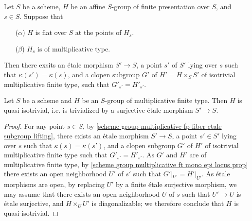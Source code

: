 \begin{theorem}\label{scheme group multiplicative fp fiber etale subgroup lifting}
Let $S$ be a scheme, $H$ be an affine $S$-group of finite presentation over $S$, and $s\in S$. Suppose that
\begin{enumerate}
    \item[($\alpha$)] $H$ is flat over $S$ at the points of $H_s$.
    \item[($\beta$)] $H_s$ is of multiplicative type. 
\end{enumerate}
Then there exsits an \'etale morphism $S'\to S$, a point $s'$ of $S'$ lying over $s$ such that $\kappa(s')=\kappa(s)$, and a clopen subgroup $G'$ of $H'=H\times_SS'$ of isotrivial multiplicative finite type, such that $G'_{s'}=H'_{s'}$.
\end{theorem}

\begin{corollary}\label{scheme group multiplicative ft is quasi-isotrivial}
Let $S$ be a scheme and $H$ be an $S$-group of multiplicative finite type. Then $H$ is quasi-isotrivial, i.e. is trivialized by a surjective \'etale morphism $S'\to S$.
\end{corollary}
\begin{proof}
For any point $s\in S$, by \cref{scheme group multiplicative fp fiber etale subgroup lifting}, there exists an \'etale morphism $S'\to S$, a point $s'\in S'$ lying over $s$ such that $\kappa(s)=\kappa(s')$, and a clopen subgroup $G'$ of $H'$ of isotrivial multiplicative finite type such that $G'_{s'}=H'_{s'}$. As $G'$ and $H'$ are of multiplicative finite type, by \cref{scheme group multiplicative ft mono epi locus prop} there exists an open neighborhood $U'$ of $s'$ such that $G'|_{U'}=H'|_{U'}$. As \'etale morphisms are open, by replacing $U'$ by a finite \'etale surjective morphism, we may assume that there exists an open neighborhood $U$ of $s$ such that $U'\to U$ is \'etale surjective, and $H\times_UU'$ is diagonalizable; we therefore conclude that $H$ is quasi-isotrivial.
\end{proof}

